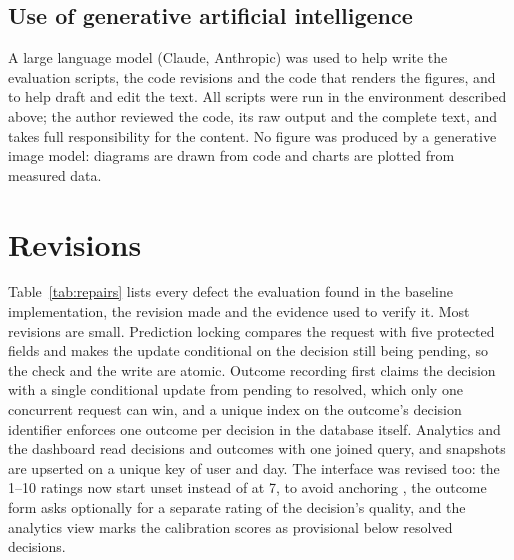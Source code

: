 \documentclass[12pt,a4paper]{article}
\begin{document}
\subsection{Use of generative artificial intelligence}\label{sec:ai}

A large language model (Claude, Anthropic) was used to help write the evaluation scripts, the code revisions and the code that renders the figures, and to help draft and edit the text. All scripts were run in the environment described above; the author reviewed the code, its raw output and the complete text, and takes full responsibility for the content. No figure was produced by a generative image model: diagrams are drawn from code and charts are plotted from measured data.

\section{Revisions}\label{sec:repairs}

Table~\ref{tab:repairs} lists every defect the evaluation found in the baseline implementation, the revision made and the evidence used to verify it. Most revisions are small. Prediction locking compares the request with five protected fields and makes the update conditional on the decision still being pending, so the check and the write are atomic. Outcome recording first claims the decision with a single conditional update from pending to resolved, which only one concurrent request can win, and a unique index on the outcome's decision identifier enforces one outcome per decision in the database itself. Analytics and the dashboard read decisions and outcomes with one joined query, and snapshots are upserted on a unique key of user and day. The interface was revised too: the 1--10 ratings now start unset instead of at 7, to avoid anchoring \cite{tversky1974}, the outcome form asks optionally for a separate rating of the decision's quality, and the analytics view marks the calibration scores as provisional below \MinimumHistory{} resolved decisions.
\end{document}
